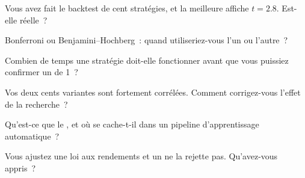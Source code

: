 \begin{interviewq}\label{iq:qm:testing-and-multiple-testing:2}
Vous avez fait le backtest de cent stratégies, et la meilleure affiche $t = 2.8$. Est-elle réelle~?
\end{interviewq}

\begin{interviewq}\label{iq:qm:testing-and-multiple-testing:3}
Bonferroni ou Benjamini--Hochberg~: quand utiliseriez-vous l'un ou l'autre~?
\end{interviewq}

\begin{interviewq}\label{iq:qm:testing-and-multiple-testing:4}
Combien de temps une stratégie doit-elle fonctionner avant que vous puissiez confirmer un  de 1~?
\end{interviewq}

\begin{interviewq}\label{iq:qm:testing-and-multiple-testing:5}
Vos deux cents variantes sont fortement corrélées. Comment corrigez-vous l'effet de la recherche~?
\end{interviewq}

\begin{interviewq}\label{iq:qm:testing-and-multiple-testing:6}
Qu'est-ce que le , et où se cache-t-il dans un pipeline d'apprentissage automatique~?
\end{interviewq}

\begin{interviewq}\label{iq:qm:testing-and-multiple-testing:7}
Vous ajustez une loi aux rendements et un  ne la rejette pas. Qu'avez-vous appris~?
\end{interviewq}
